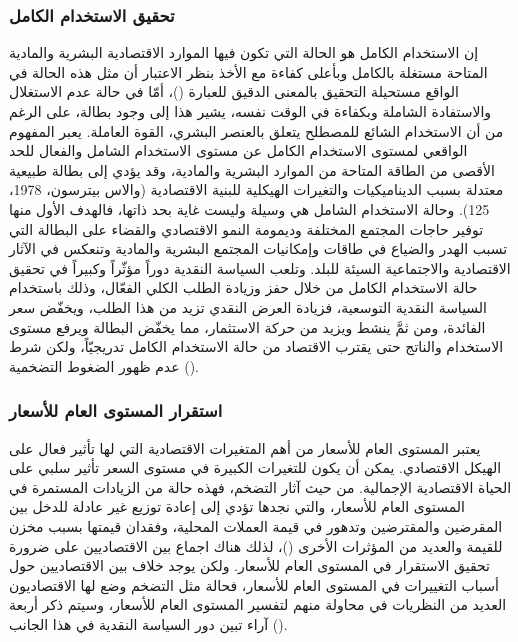 \documentclass[10pt,a4paper]{report}
\begin{document}
\begin{doublespacing}
\subsubsection{تحقيق الاستخدام الكامل}
إن الاستخدام الكامل هو الحالة التي تكون فيها الموارد الاقتصادية البشرية والمادية المتاحة مستغلة بالكامل وبأعلى كفاءة مع الأخذ بنظر الاعتبار أن مثل هذه الحالة في الواقع مستحيلة التحقيق بالمعنى الدقيق للعبارة ()، أمّا في حالة عدم الاستغلال والاستفادة الشاملة وبكفاءة في الوقت نفسه، يشير هذا إلى وجود بطالة، على الرغم من أن الاستخدام الشائع للمصطلح يتعلق بالعنصر البشري، القوة العاملة. يعبر المفهوم الواقعي لمستوى الاستخدام الكامل عن مستوى الاستخدام الشامل والفعال للحد الأقصى من الطاقة المتاحة من الموارد البشرية والمادية، وقد يؤدي إلى بطالة طبيعية معتدلة بسبب الديناميكيات والتغيرات الهيكلية للبنية الاقتصادية ({والاس بيترسون، 1978، 125}). وحالة الاستخدام الشامل هي وسيلة وليست غاية بحد ذاتها، فالهدف الأول منها توفير حاجات المجتمع المختلفة وديمومة النمو الاقتصادي والقضاء على البطالة التي تسبب الهدر والضياع في طاقات وإمكانيات المجتمع البشرية والمادية وتنعكس في الآثار الاقتصادية والاجتماعية السيئة للبلد. 
وتلعب السياسة النقدية دوراً مؤثّراً وكبيراً في تحقيق حالة الاستخدام الكامل من خلال حفز وزيادة الطلب الكلي الفعّال، وذلك باستخدام السياسة النقدية التوسعية، فزيادة العرض النقدي تزيد من هذا الطلب، ويخفّض سعر الفائدة، ومن ثمَّ ينشط ويزيد من حركة الاستثمار، مما يخفّض البطالة ويرفع مستوى الاستخدام والناتج حتى يقترب الاقتصاد من حالة الاستخدام الكامل تدريجيّاً، ولكن شرط عدم ظهور الضغوط التضخمية ().
\subsubsection{استقرار المستوى العام للأسعار}
يعتبر المستوى العام للأسعار من أهم المتغيرات الاقتصادية التي لها تأثير فعال على الهيكل الاقتصادي. يمكن أن يكون للتغيرات الكبيرة في مستوى السعر تأثير سلبي على الحياة الاقتصادية الإجمالية. من حيث آثار التضخم، فهذه حالة من الزيادات المستمرة في المستوى العام للأسعار، والتي نجدها تؤدي إلى إعادة توزيع غير عادلة للدخل بين المقرضين والمقترضين وتدهور في قيمة العملات المحلية، وفقدان قيمتها بسبب مخزن للقيمة والعديد من المؤثرات الأخرى ()، لذلك هناك اجماع بين الاقتصاديين على ضرورة تحقيق الاستقرار في المستوى العام للأسعار. ولكن يوجد خلاف بين الاقتصاديين حول أسباب التغييرات في المستوى العام للأسعار، فحالة مثل التضخم وضع لها الاقتصاديون العديد من النظريات في محاولة منهم لتفسير المستوى العام للأسعار، وسيتم ذكر أربعة آراء تبين دور السياسة النقدية في هذا الجانب ().


\end{doublespacing}
\end{document}

